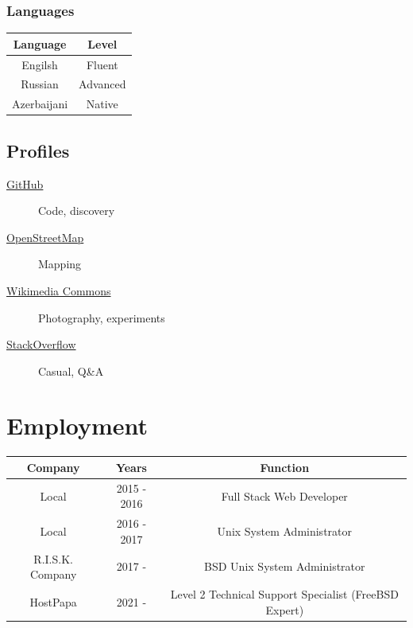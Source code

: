\documentclass {article}
\begin{document}
    \subsubsection{Languages}
    \begin{center}
        \begin {tabular} { | c | c  | }
            \hline
            \textbf {Language} & \textbf {Level} \\
            \hline
            Engilsh            & Fluent          \\
            Russian            & Advanced        \\
            Azerbaijani        & Native          \\
            \hline
        \end{tabular}
    \end{center}

    \subsection{Profiles}
    \begin{description}
        \item[\href{https://github.com/rwp0}{GitHub}] Code, discovery
        \item[\href{https://www.openstreetmap.org/user/rwp_}{OpenStreetMap}] Mapping
        \item[\href{https://commons.wikimedia.org/wiki/User:Rwp0}{Wikimedia Commons}] Photography, experiments
        \item[\href{https://stackoverflow.com/users/13762488/rwp}{StackOverflow}] Casual, Q\&A
    \end{description}


    \section{Employment}
    \begin{center}
        \begin {tabular} { | c | c | c  | }
            \hline
            \textbf {Company} & \textbf {Years} & \textbf {Function}                                    \\
            \hline
            Local             & 2015 - 2016     & Full Stack Web Developer                              \\
            Local             & 2016 - 2017     & Unix System Administrator                             \\
            R.I.S.K. Company  & 2017 -          & BSD Unix System Administrator                         \\
            HostPapa          & 2021 -          & Level 2 Technical Support Specialist (FreeBSD Expert) \\
            \hline
        \end{tabular}
    \end{center}
\end{document}
